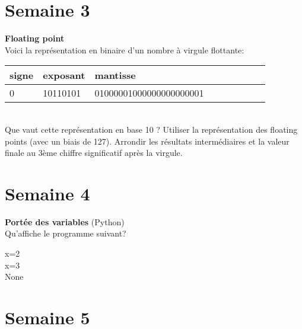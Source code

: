 \section*{Semaine 3}
\begin{Exercice}[10 minutes] \textbf{Floating point}\\
    
    Voici la représentation en binaire d'un nombre à virgule flottante: \\
    
     \begin{tabular}{| p{1cm} | p{3cm} | p{9.5cm} | p{1cm} | p{1cm} | p{1cm} | p{1cm} | p{1cm} | p{1cm} |} 
            \hline
            signe & exposant & mantisse \\ [0.5ex] 
            \hline
            0 & 10110101 & 01000001000000000000001 \\ [0.5ex]
            \hline
	\end{tabular}
	\\
    Que vaut cette représentation en base 10 ? Utiliser la représentation des floating points (avec un biais de 127). Arrondir les résultats intermédiaires et la valeur finale au 3ème chiffre significatif après la virgule. \\
	
    
\end{Exercice}

\section*{Semaine 4}

\begin{Exercice}[5 minutes] \textbf{Portée des variables} (Python)\\
    Qu'affiche le programme suivant? \\

    

    \begin{solution}
            x=2 \\
            x=3 \\
            None
    \end{solution}

    
 \end{Exercice}
 
 
 \section*{Semaine 5}
 
